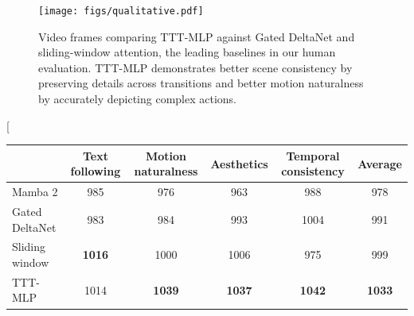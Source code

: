 \begin{landscape}
\begin{figure}
    \centering
    \texttt{[image: figs/qualitative.pdf]}
    \caption{Video frames comparing TTT-MLP against Gated DeltaNet and sliding-window attention, the leading baselines in our human evaluation. 
    TTT-MLP demonstrates better scene consistency by preserving details across transitions and better motion naturalness by accurately depicting complex actions.}
    \label{fig:qualitative}
\end{figure}
\end{landscape}

\twocolumn[{
\centering
\setlength{\tabcolsep}{6pt}
\renewcommand{\arraystretch}{1.3}
\begin{tabular}{lcccc|c}
    \toprule
     & Text following & Motion naturalness & Aesthetics & Temporal consistency & Average \\
    \midrule
    {Mamba 2} & 985 & 976 & 963 & 988 & 978  \\
    {Gated DeltaNet} & 983 & 984 & 993 & 1004 & 991 \\
    {Sliding window} & \textbf{1016} & 1000 & 1006 & 975 & 999 \\
    {TTT-MLP} & 1014 & \textbf{1039} & \textbf{1037} & \textbf{1042} & \textbf{1033} \\
    \bottomrule
    \end{tabular}
    \label{tab:multiaxis_evaluation}

}
